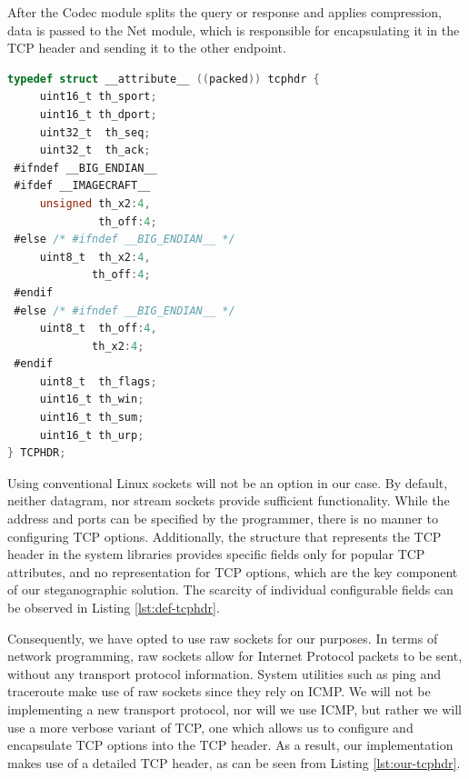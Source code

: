 After the Codec module splits the query or response and applies compression,
data is passed to the Net module, which is responsible for encapsulating it in
the TCP header and sending it to the other endpoint.

\begin{lstlisting}[caption={Default TCP Header Structure},
                   label={lst:def-tcphdr},
                   basicstyle=\footnotesize,
                   captionpos=b,
                   frame=single,
                   language=C
                  ]
typedef struct __attribute__ ((packed)) tcphdr {
     uint16_t th_sport;
     uint16_t th_dport;
     uint32_t  th_seq;
     uint32_t  th_ack;
 #ifndef __BIG_ENDIAN__
 #ifdef __IMAGECRAFT__
     unsigned th_x2:4,
              th_off:4;
 #else /* #ifndef __BIG_ENDIAN__ */
     uint8_t  th_x2:4,
             th_off:4;
 #endif
 #else /* #ifndef __BIG_ENDIAN__ */
     uint8_t  th_off:4,
             th_x2:4;
 #endif
     uint8_t  th_flags;
     uint16_t th_win;
     uint16_t th_sum;
     uint16_t th_urp;
} TCPHDR;
\end{lstlisting}

Using conventional Linux sockets will not be an option in our case. By default,
neither datagram, nor stream sockets provide sufficient functionality. While the
address and ports can be specified by the programmer, there is no manner to
configuring TCP options. Additionally, the structure that represents the TCP header
in the system libraries provides specific fields only for popular TCP attributes,
and no representation for TCP options, which are the key component of our
steganographic solution. The scarcity of individual configurable fields can be
observed in Listing \ref{lst:def-tcphdr}.

Consequently, we have opted to use raw sockets for our purposes. In terms of
network programming, raw sockets allow for Internet Protocol packets to be sent,
without any transport protocol information. System utilities such as ping and
traceroute make use of raw sockets since they rely on ICMP. We will not be
implementing a new transport protocol, nor will we use ICMP, but rather we will
use a more verbose variant of TCP, one which allows us to configure and
encapsulate TCP options into the TCP header. As a result, our implementation
makes use of a detailed TCP header, as can be seen from Listing \ref{lst:our-tcphdr}.


